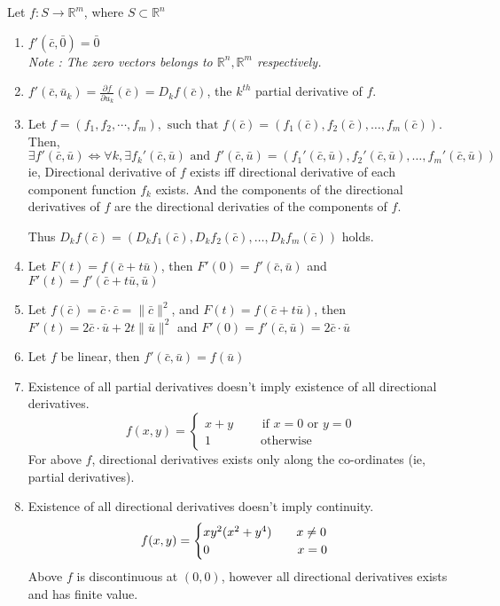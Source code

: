 \begin{remark}[Properties] Let \(f : S \to \mathbb{R}^m \), where \( S \subset \mathbb{R}^n\)
\begin{enumerate}
	\item \( f'(\bar{c},\bar{0}) = \bar{0} \)\\
	\textsl{Note : The zero vectors belongs to $\mathbb{R}^n, \mathbb{R}^m$ respectively.}
	\item \( f'(\bar{c},\bar{u}_k) = \frac{\partial f}{\partial u_k}(\bar{c}) = D_k f(\bar{c}) \), the $k^{th}$ partial derivative of $f$.
	\item Let \( f = (f_1, f_2, \cdots, f_m), \text{ such that } f(\bar{c}) = \left(f_1(\bar{c}),f_2(\bar{c}),\dotsc,f_m(\bar{c})\right) \).
	Then, 
		\[ \exists f'(\bar{c},\bar{u}) \iff \forall k, \exists f_k'(\bar{c},\bar{u}) \text{ and } f'(\bar{c},\bar{u}) = \left(f_1'(\bar{c},\bar{u}),f_2'(\bar{c},\bar{u}),\dotsc,f_m'(\bar{c},\bar{u})\right) \]
	ie, Directional derivative of $f$ exists iff directional derivative of each component function $f_k$ exists.
	And the components of the directional derivatives of $f$ are the directional derivaties of the components of $f$.

	Thus \( D_k f(\bar{c}) = \left(D_k f_1(\bar{c}),D_k f_2(\bar{c}),\dotsc,D_k f_m(\bar{c}) \right) \) holds.
	\item Let \( F(t) = f(\bar{c}+t\bar{u}) \), then \( F'(0) = f'(\bar{c},\bar{u}) \) and \( F'(t) = f'(\bar{c}+t\bar{u},\bar{u}) \)
	\item Let \( f(\bar{c}) = \bar{c} \cdot \bar{c} = \|\bar{c}\|^2 \), and \(F(t) = f(\bar{c}+t\bar{u}) \), then \( F'(t) = 2\bar{c} \cdot \bar{u}+2t\|\bar{u}\|^2 \) and \( F'(0) = f'(\bar{c},\bar{u}) = 2\bar{c} \cdot \bar{u} \)
	\item Let \(f\) be linear, then \( f'(\bar{c},\bar{u}) = f(\bar{u}) \)
	\item Existence of all partial derivatives doesn't imply existence of all directional derivatives.
	\[ f(x,y) = \begin{cases} x+y \qquad \text{ if } x = 0 \text{ or } y = 0 \\ 1 \qquad \qquad \text{otherwise} \end{cases} \]
	For above \(f\), directional derivatives exists only along the co\nobreakdash-ordinates (ie, partial derivatives).
	\item Existence of all directional derivatives doesn't imply continuity.
	\[ f(x,y) = \begin{cases} xy^2(x^2+y^4) \qquad x \ne 0 \\ 0 \hspace{2.5cm} x = 0 \end{cases} \]
	Above \(f\) is discontinuous at \((0,0)\), however all directional derivatives exists and has finite value.
	\end{enumerate}
\end{remark}

